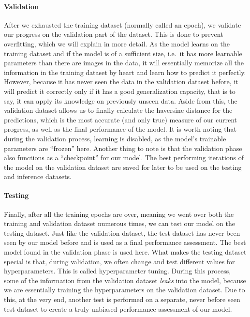 \documentclass[]{article}
\let\oldparagraph\paragraph
\renewcommand{\paragraph}[1]{\oldparagraph{#1}\mbox{}}
\begin{document}
\hypertarget{validation}{%
\paragraph{Validation}\label{validation}}

After we exhausted the training dataset (normally called an epoch), we
validate our progress on the validation part of the dataset. This is
done to prevent overfitting, which we will explain in more detail. As
the model learns on the training dataset and if the model is of a
sufficient size, i.e.~it has more learnable parameters than there are
images in the data, it will essentially memorize all the information in
the training dataset by heart and learn how to predict it perfectly.
However, because it has never seen the data in the validation dataset
before, it will predict it correctly only if it has a good
generalization capacity, that is to say, it can apply its knowledge on
previously unseen data. Aside from this, the validation dataset allows
us to finally calculate the haversine distance for the predictions,
which is the most accurate (and only true) measure of our current
progress, as well as the final performance of the model. It is worth
noting that during the validation process, learning is disabled, as the
model's trainable parameters are ``frozen'' here. Another thing to note
is that the validation phase also functions as a ``checkpoint'' for our
model. The best performing iterations of the model on the validation
dataset are saved for later to be used on the testing and inference
datasets.

\hypertarget{testing}{%
\paragraph{Testing}\label{testing}}

Finally, after all the training epochs are over, meaning we went over
both the training and validation dataset numerous times, we can test our
model on the testing dataset. Just like the validation dataset, the test
dataset has never been seen by our model before and is used as a final
performance assessment. The best model found in the validation phase is
used here. What makes the testing dataset special is that, during
validation, we often change and test different values for
hyperparameters. This is called hyperparameter tuning. During this
process, some of the information from the validation dataset
\emph{leaks} into the model, because we are essentially training the
hyperparameters on the validation dataset. Due to this, at the very end,
another test is performed on a separate, never before seen test dataset
to create a truly unbiased performance assessment of our model.
\end{document}
